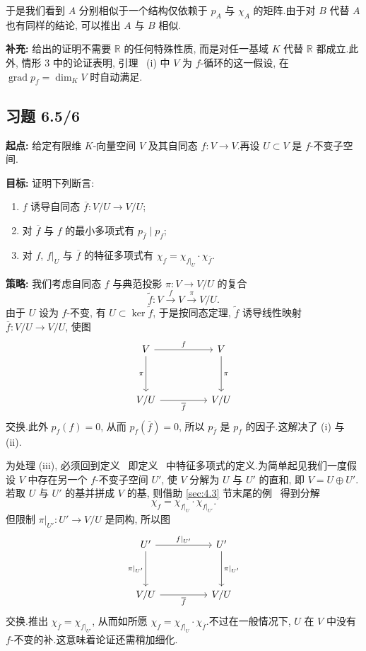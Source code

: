 于是我们看到 $A$ 分别相似于一个结构仅依赖于 $p_A$ 与 $\chi_A$ 的矩阵.由于对 $B$ 代替 $A$ 也有同样的结论, 可以推出 $A$ 与 $B$ 相似.

\noindent\textbf{补充:} 给出的证明不需要 $\mathbb{R}$ 的任何特殊性质, 而是对任一基域 $K$ 代替 $\mathbb{R}$ 都成立.此外, 情形 3 中的论证表明, 引理~ (i) 中 $V$ 为 $f$-循环的这一假设, 在 $\operatorname{grad} p_f = \dim_K V$ 时自动满足.

\subsection*{习题 6.5/6}

\noindent\textbf{起点:} 给定有限维 $K$-向量空间 $V$ 及其自同态 $f \colon V \longrightarrow V$.再设 $U \subset V$ 是 $f$-不变子空间.

\noindent\textbf{目标:} 证明下列断言:
\begin{enumerate}
\item[(i)] $f$ 诱导自同态 $\overline{f} \colon V/U \longrightarrow V/U$;
\item[(ii)] 对 $\overline{f}$ 与 $f$ 的最小多项式有 $p_{\overline{f}} \mid p_f$;
\item[(iii)] 对 $f$, $f|_U$ 与 $\overline{f}$ 的特征多项式有 $\chi_f = \chi_{f|_U} \cdot \chi_{\overline{f}}$.
\end{enumerate}

\noindent\textbf{策略:} 我们考虑自同态 $f$ 与典范投影 $\pi \colon V \longrightarrow V/U$ 的复合
\[
\tilde{f} \colon V \xrightarrow{f} V \xrightarrow{\pi} V/U\text{.}
\]
由于 $U$ 设为 $f$-不变, 有 $U \subset \ker \tilde{f}$, 于是按同态定理, $\tilde{f}$ 诱导线性映射 $\overline{f} \colon V/U \longrightarrow V/U$, 使图
\[
\begin{tikzcd}[row sep=huge, column sep=huge]
V \arrow[r, "f"] \arrow[d, "\pi"'] & V \arrow[d, "\pi"] \\
V/U \arrow[r, "\overline{f}"'] & V/U
\end{tikzcd}
\]
交换.此外 $p_f(f) = 0$, 从而 $p_f(\overline{f}) = 0$, 所以 $p_{\overline{f}}$ 是 $p_f$ 的因子.这解决了 (i) 与 (ii).

为处理 (iii), 必须回到定义~ 即定义~ 中特征多项式的定义.为简单起见我们一度假设 $V$ 中存在另一个 $f$-不变子空间 $U'$, 使 $V$ 分解为 $U$ 与 $U'$ 的直和, 即 $V = U \oplus U'$.若取 $U$ 与 $U'$ 的基并拼成 $V$ 的基, 则借助 \ref{sec:4.3} 节末尾的例~ 得到分解
\[
\chi_f = \chi_{f|_U} \cdot \chi_{f|_{U'}}\text{.}
\]
但限制 $\pi|_{U'} \colon U' \longrightarrow V/U$ 是同构, 所以图
\[
\begin{tikzcd}[row sep=huge, column sep=huge]
U' \arrow[r, "f|_{U'}"] \arrow[d, "\pi|_{U'}"'] & U' \arrow[d, "\pi|_{U'}"] \\
V/U \arrow[r, "\overline{f}"'] & V/U
\end{tikzcd}
\]
交换.推出 $\chi_{\overline{f}} = \chi_{f|_{U'}}$, 从而如所愿 $\chi_f = \chi_{f|_U} \cdot \chi_{\overline{f}}$.不过在一般情况下, $U$ 在 $V$ 中没有 $f$-不变的补.这意味着论证还需稍加细化.

